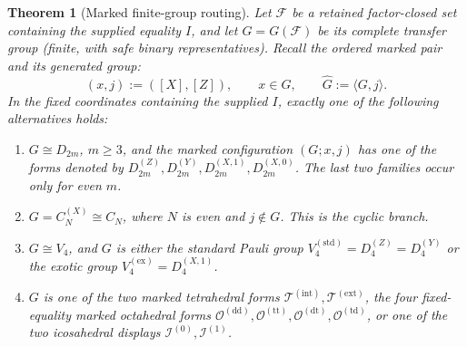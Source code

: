 \documentclass[11pt,letterpaper,onecolumn]{article}
\theoremstyle{plain}
\newtheorem{theorem}{Theorem}[section]
\theoremstyle{definition}
\theoremstyle{remark}
\newcommand{\cF}{\mathcal F}
\newcommand{\DihZ}[1]{{D_{#1}^{(Z)}}}
\newcommand{\DihY}[1]{{D_{#1}^{(Y)}}}
\newcommand{\DihXzero}[1]{{D_{#1}^{(X,0)}}}
\newcommand{\DihXone}[1]{{D_{#1}^{(X,1)}}}
\newcommand{\CycX}[1]{{C_{#1}^{(X)}}}
\newcommand{\KleinStd}{{V_4^{(\mathrm{std})}}}
\newcommand{\KleinEx}{{V_4^{(\mathrm{ex})}}}
\newcommand{\TetInt}{{\mathcal T^{(\mathrm{int})}}}
\newcommand{\TetExt}{{\mathcal T^{(\mathrm{ext})}}}
\newcommand{\OctDD}{{\mathcal O^{(\mathrm{dd})}}}
\newcommand{\OctTT}{{\mathcal O^{(\mathrm{tt})}}}
\newcommand{\OctDT}{{\mathcal O^{(\mathrm{dt})}}}
\newcommand{\OctTD}{{\mathcal O^{(\mathrm{td})}}}
\newcommand{\IcoZero}{{\mathcal I^{(0)}}}
\newcommand{\IcoOne}{{\mathcal I^{(1)}}}
\begin{document}
\begin{theorem}[Marked finite-group routing]
\label{thm:marked-finite-group-routing}
Let \(\cF\) be a retained factor-closed set containing the
supplied equality \(I\), and let \(G=G(\cF)\) be its complete transfer group (finite, with safe binary representatives).  Recall the ordered marked pair and its generated
group:
\[
 (x,j):=([X],[Z]),\qquad x\in G,\qquad \widehat G:=\langle G,j\rangle.
\]
In the fixed coordinates containing the supplied \(I\), exactly
one of the following alternatives holds:
\begin{enumerate}
\item \(G\cong D_{2m}\), \(m\ge3\), and the marked configuration
      \((G;x,j)\) has one of the forms denoted by
      \(\DihZ{2m},\DihY{2m},\DihXone{2m},\DihXzero{2m}\).  The last
      two families occur only for even \(m\).
\item \(G=\CycX{N}\cong C_N\), where \(N\) is even and \(j\notin G\).  This is
      the cyclic branch.
\item \(G\cong V_4\), and \(G\) is either the standard Pauli group
      \(\KleinStd=\DihZ{4}=\DihY{4}\) or the exotic group
      \(\KleinEx=\DihXone{4}\).
\item \(G\) is one of the two marked tetrahedral forms
      \(\TetInt,\TetExt\), the four fixed-equality marked
      octahedral forms
      \(\OctDD,\OctTT,\OctDT,\OctTD\), or one of the two icosahedral displays
      \(\IcoZero,\IcoOne\).
\end{enumerate}


\end{theorem}
\end{document}
